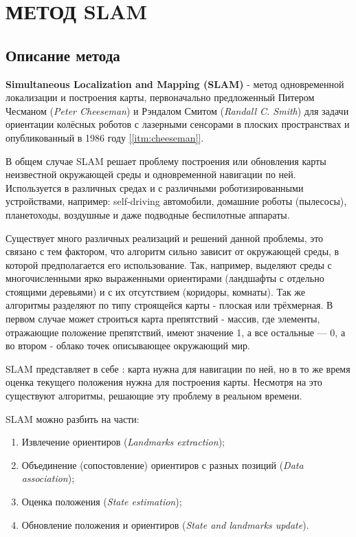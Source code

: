 \chapter{МЕТОД SLAM}

\section{Описание метода}

\textbf{Simultaneous Localization and Mapping (SLAM)} - метод одновременной локализации и построения карты, первоначально предложенный Питером Чесманом (\textit{Peter Cheeseman}) и Рэндалом Смитом (\textit{Randall C. Smith}) для задачи ориентации колёсных роботов с лазерными сенсорами в плоских пространствах и опубликованный в 1986 году \hyperref[itm:cheeseman]{[\ref{itm:cheeseman}]}.

В общем случае SLAM решает проблему построения или обновления карты неизвестной окружающей среды и одновременной навигации по ней. Используется в различных средах и с различными роботизированными устройствами, например: self-driving автомобили, домашние роботы (пылесосы), планетоходы, воздушные и даже подводные беспилотные аппараты.

Существует много различных реализаций и решений данной проблемы, это связано с тем фактором, что алгоритм сильно зависит от окружающей среды, в которой предполагается его использование. Так, например, выделяют среды с многочисленными ярко выраженными ориентирами (ландшафты с отдельно стоящими деревьями) и с их отсутствием (коридоры, комнаты). Так же алгоритмы разделяют по типу строящейся карты - плоская или трёхмерная. В первом случае может строиться карта препятствий - массив, где элементы, отражающие положение препятствий, имеют значение 1, а все остальные — 0, а во втором - облако точек описывающее окружающий мир.

SLAM представляет в себе : карта нужна для навигации по ней, но в то же время оценка текущего положения нужна для построения карты. Несмотря на это существуют алгоритмы, решающие эту проблему в реальном времени.

\vspace{1mm}
SLAM можно разбить на части:
\begin{enumerate}
    \item Извлечение ориентиров (\textit{Landmarks extraction});
    \item Объединение (сопостовление) ориентиров с разных позиций (\textit{Data association});
    \item Оценка положения (\textit{State estimation});
    \item Обновление положения и ориентиров (\textit{State and landmarks update}).
\end{enumerate}


